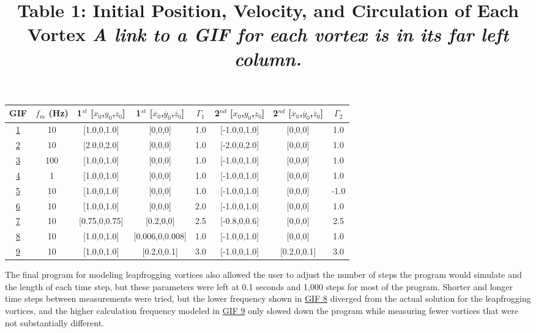 \documentclass{article}
\begin{document}
\begin{table}
	\centering
	\title{Table 1: Initial Position, Velocity, and Circulation of Each Vortex \newline}
	\title{\emph{A link to a GIF for each vortex is in its far left column.}}
	\begin{tabular}{ | c | c | c | c | c | c | c | c |}
		\hline
		GIF & $f_m$ (Hz) & 1$^{st}$ [$x_0$,$y_0$,$z_0$] & 1$^{st}$ [$\dot{x_0}$,$\dot{y_0}$,$\dot{z_0}$] & $\Gamma_1$ & 2$^{nd}$ [$x_0$,$y_0$,$z_0$] & 2$^{nd}$ [$\dot{x_0}$,$\dot{y_0}$,$\dot{z_0}$] & $\Gamma_2$ \\ \hline
		\href{https://imgur.com/U4cND6X}{1} & 10 & [1.0,0,1.0] & [0,0,0] & 1.0 & [-1.0,0,1.0] & [0,0,0] & 1.0 \\ \hline
		\href{https://imgur.com/lviamWB}{2} & 10 & [2.0,0,2.0] & [0,0,0] & 1.0 & [-2.0,0,2.0] & [0,0,0] & 1.0 \\ \hline
		\href{https://imgur.com/6jT1mT0}{3} & 100 & [1.0,0,1.0] & [0,0,0] & 1.0 & [-1.0,0,1.0] & [0,0,0] & 1.0 \\ \hline
		\href{https://imgur.com/PtazOFB}{4} & 1 & [1.0,0,1.0] & [0,0,0] & 1.0 & [-1.0,0,1.0] & [0,0,0] & 1.0 \\ \hline	
		\href{https://imgur.com/wSpWEQV}{5} & 10 & [1.0,0,1.0] & [0,0,0] & 1.0 & [-1.0,0,1.0] & [0,0,0] & -1.0 \\ \hline
		\href{https://imgur.com/aZzMnJV}{6} & 10 & [1.0,0,1.0] & [0,0,0] & 2.0 & [-1.0,0,1.0] & [0,0,0] & 1.0 \\ \hline
		\href{https://imgur.com/nKVGuJ9}{7} & 10 & [0.75,0,0.75] & [0.2,0,0] & 2.5 & [-0.8,0,0.6] & [0,0,0] & 2.5 \\ \hline
		\href{https://imgur.com/UZyBsYO}{8} & 10 & [1.0,0,1.0] & [0.006,0,0.008] & 1.0 & [-1.0,0,1.0] & [0,0,0] & 1.0 \\ \hline
		\href{https://imgur.com/tctJPyS}{9} & 10 & [1.0,0,1.0] & [0.2,0,0.1] & 3.0 & [-1.0,0,1.0] & [0.2,0,0.1] & 3.0 \\ \hline
	\end{tabular}
\end{table}

The final program for modeling leapfrogging vortices also allowed the user to adjust the number of steps the program would simulate and the length of each time step, but these parameters were left at 0.1 seconds and 1,000 steps for most of the program. Shorter and longer time steps between measurements were tried, but the lower frequency shown in \href{https://imgur.com/PtazOFB}{GIF 8} diverged from the actual solution for the leapfrogging vortices, and the higher calculation frequency modeled in \href{https://imgur.com/6jT1mT0}{GIF 9} only slowed down the program while measuring fewer vortices that were not substantially different. \newline
\end{document}

